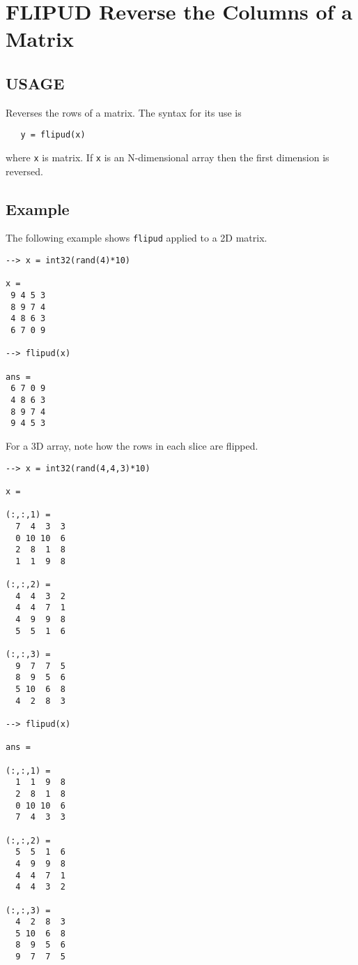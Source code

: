 \section{FLIPUD Reverse the Columns of a Matrix}

\subsection{USAGE}

Reverses the rows of a matrix.  The syntax for its use is
\begin{verbatim}
   y = flipud(x)
\end{verbatim}
where \verb|x| is matrix.  If \verb|x| is an N-dimensional array then
the first dimension is reversed.
\subsection{Example}

The following example shows \verb|flipud| applied to a 2D matrix.
\begin{verbatim}
--> x = int32(rand(4)*10)

x = 
 9 4 5 3 
 8 9 7 4 
 4 8 6 3 
 6 7 0 9 

--> flipud(x)

ans = 
 6 7 0 9 
 4 8 6 3 
 8 9 7 4 
 9 4 5 3 
\end{verbatim}
For a 3D array, note how the rows in each slice are flipped.
\begin{verbatim}
--> x = int32(rand(4,4,3)*10)

x = 

(:,:,1) = 
  7  4  3  3 
  0 10 10  6 
  2  8  1  8 
  1  1  9  8 

(:,:,2) = 
  4  4  3  2 
  4  4  7  1 
  4  9  9  8 
  5  5  1  6 

(:,:,3) = 
  9  7  7  5 
  8  9  5  6 
  5 10  6  8 
  4  2  8  3 

--> flipud(x)

ans = 

(:,:,1) = 
  1  1  9  8 
  2  8  1  8 
  0 10 10  6 
  7  4  3  3 

(:,:,2) = 
  5  5  1  6 
  4  9  9  8 
  4  4  7  1 
  4  4  3  2 

(:,:,3) = 
  4  2  8  3 
  5 10  6  8 
  8  9  5  6 
  9  7  7  5 
\end{verbatim}
